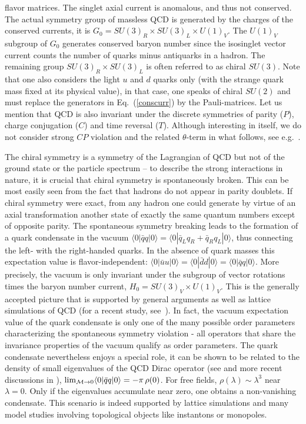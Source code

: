 \documentclass[aps,rmp,nofootinbib,twocolumn,floatfix]{revtex4}
\begin{document}
flavor matrices. The singlet axial current is anomalous,
and thus not conserved. The actual symmetry group of massless QCD
is generated by the charges of the conserved currents, it is
$G_0 = SU(3)_R \times SU(3)_L \times U(1)_V$. The $U(1)_V$ subgroup of 
$G_0$ generates conserved baryon number since the isosinglet vector 
current counts the number of quarks minus antiquarks in a hadron. 
The remaining group $SU(3)_R \times SU(3)_L$ is often
referred to as chiral $SU(3)$. Note that one also considers the light
$u$ and $d$ quarks only (with the strange quark mass fixed at its
physical value), in that case, one speaks of chiral $SU(2)$ and
must replace the generators in Eq.~(\ref{conscurr}) by the Pauli-matrices.
Let us mention that QCD is also invariant under the discrete symmetries of
parity ($P$), charge conjugation ($C$) and time reversal ($T$). 
Although interesting in itself, we do not consider strong $CP$ violation and
the related $\theta$-term in what follows, see e.g.~\cite{Peccei:2006as}.

The chiral symmetry is a symmetry of the Lagrangian of QCD but not of the
ground state or the particle spectrum -- to describe the strong interactions
in nature, it is crucial that chiral symmetry is spontaneously broken. This
can be most easily seen from the fact that hadrons do not appear in parity
doublets. If chiral symmetry were exact, from any hadron one could generate
by virtue of an axial transformation another state of exactly the same 
quantum numbers except of opposite parity. The spontaneous symmetry breaking
leads to  the formation of a quark condensate in the vacuum 
$\langle 0 | \bar q q|0\rangle =\langle 0  | \bar q_L q_R + \bar q_R q_L|0\rangle$, 
thus connecting the left- with the right-handed
quarks. In the absence of quark masses this expectation value
is flavor-independent: $\langle 0 | \bar u u|0\rangle = 
\langle 0 | \bar d d|0\rangle = \langle 0 | \bar q q|0\rangle$. 
More precisely, the vacuum is only invariant under the subgroup of 
vector rotations times the baryon number current, $H_0 = SU(3)_V \times
U(1)_V$. This is the generally accepted picture that is supported by general
arguments \cite{Vafa:1983tf} as well as lattice simulations of QCD (for 
a recent study, see~\cite{Giusti:2007cn}).
In fact, the vacuum expectation value of the quark condensate is only one
of the many possible order parameters characterizing the spontaneous symmetry
violation - all operators that share the invariance properties of the
vacuum 
qualify as order parameters. The quark condensate
nevertheless enjoys a special role, it can be shown to be related to the
density of small eigenvalues of the QCD Dirac operator 
(see \cite{Banks:1979yr} and more recent discussions 
in \cite{Leutwyler:1992yt,Stern:1998dy}),
$\lim_{{\cal M} \to 0} \langle 0 | \bar q q|0\rangle = - \pi \, \rho(0)$.
For free fields, $\rho (\lambda) \sim \lambda^3$ near $\lambda = 0$. Only if
the eigenvalues accumulate near zero, one obtains a non-vanishing condensate.
This scenario is indeed supported by lattice simulations and many model studies
involving topological objects like instantons or monopoles.
\end{document}
